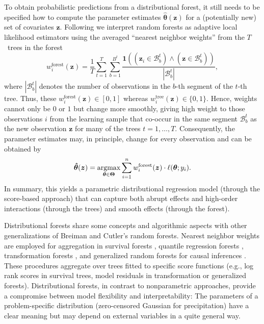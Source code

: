\documentclass[aoas, preprint]{imsart}
\newcommand{\argmax}{\operatorname{argmax}\displaylimits}
\numberwithin{equation}{subsection}
\begin{document}
To obtain probabilistic predictions from a distributional forest, it still
needs to be specified how to compute the parameter estimates
$\bm{\hat \theta}(\bm{z})$ for a (potentially new) set of covariates $\bm{z}$.
Following \cite{Hothorn+Zeileis:2017} we interpret random forests as adaptive
local likelihood estimators using the averaged ``nearest neighbor weights''
\citep{Lin+Jeon:2006} from the $T$~trees in the forest
\begin{equation}
w^{\text{forest}}_i(\bm{z}) = \frac{1}{T} \sum_{t=1}^T \sum_{b=1}^{B^t}
\frac{\mathbf{1}((\bm{z}_i \in \mathcal{B}^t_b) \land (\bm{z} \in \mathcal{B}^t_b))}{|\mathcal{B}^t_b|},
\end{equation}
where $|\mathcal{B}^t_b|$ denotes the number of observations in the $b$-th
segment of the $t$-th tree.
Thus, these $w^{\text{forest}}_i(\bm{z}) \in [0, 1]$ whereas
$w^{\text{tree}}_i(\bm{z}) \in \{0, 1\}$. Hence, weights cannot only be $0$
or $1$ but change more smoothly, giving high weight to those observations $i$
from the learning sample that co-occur in the same segment $\mathcal{B}_b^t$
as the new observation $\bm{z}$ for many of the trees $t = 1, \dots, T$.
Consequently, the parameter estimates may, in principle, change for every
observation and can be obtained by
\begin{equation}
\bm{\hat \theta}(\bm{z}) =  \argmax_{\bm{\theta} \in \bm{\Theta}} \sum_{i=1}^n w^{\text{forest}}_i(\bm{z}) \cdot \ell(\bm{\theta}; y_i).
\end{equation}
In summary, this yields a parametric distributional regression model 
(through the score-based approach) that can capture both abrupt effects and
high-order interactions (through the trees) and smooth effects (through
the forest).

Distributional forests share some concepts and algorithmic aspects 
with other generalizations of Breiman and Cutler's random forests. Nearest 
neighbor weights are employed for aggregation in survival forests 
\citep{Hothorn+Lausen+Benner:2004},
quantile regression forests \citep{Meinshausen:2006},
transformation forests \citep{Hothorn+Zeileis:2017},
and generalized random forests for causal inferences 
\citep{Athey+Tibshirani+Wager:2019}.
These procedures aggregate over trees fitted to specific score functions 
(e.g., log rank scores in survival trees, model residuals in transformation 
or generalized forests). Distributional forests, in contrast to 
nonparametric approaches, provide a compromise between model flexibility 
and interpretability: The parameters of a problem-specific distribution 
(zero-censored Gaussian for precipitation) have a clear meaning but 
may depend on external variables in a quite general way.
\end{document}

